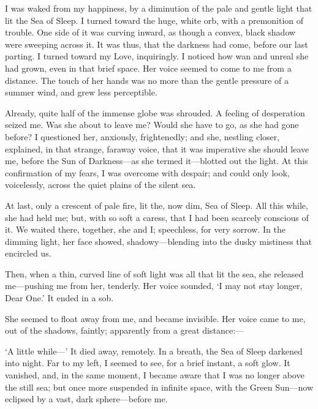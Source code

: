 
\clearpage
\label{ch:15}

\begin{ChapterStart}
\null\null
{}
\end{ChapterStart}

I was waked from my happiness, by a diminution of the pale and gentle light that lit the Sea of Sleep. I turned toward the huge, white orb, with a premonition of trouble. One side of it was curving inward, as though a convex, black shadow were sweeping across it. It was thus, that the darkness had come, before our last parting. I turned toward my Love, inquiringly. I noticed how wan and unreal she had grown, even in that brief space. Her voice seemed to come to me from a distance. The touch of her hands was no more than the gentle pressure of a summer wind, and grew less perceptible.

Already, quite half of the immense globe was shrouded. A feeling of desperation seized me. Was she about to leave me? Would she have to go, as she had gone before? I questioned her, anxiously, frightenedly; and she, nestling closer, explained, in that strange, faraway voice, that it was imperative she should leave me, before the Sun of Darkness---as she termed it---blotted out the light. At this confirmation of my fears, I was overcome with despair; and could only look, voicelessly, across the quiet plains of the silent sea.

At last, only a crescent of pale fire, lit the, now dim, Sea of Sleep. All this while, she had held me; but, with so soft a caress, that I had been scarcely conscious of it. We waited there, together, she and I; speechless, for very sorrow. In the dimming light, her face showed, shadowy---blending into the dusky mistiness that encircled us.

Then, when a thin, curved line of soft light was all that lit the sea, she released me---pushing me from her, tenderly. Her voice sounded, ‘I may not stay longer, Dear One.’ It ended in a sob.

She seemed to float away from me, and became invisible. Her voice came to me, out of the shadows, faintly; apparently from a great distance:---

‘A little while---’ It died away, remotely. In a breath, the Sea of Sleep darkened into night. Far to my left, I seemed to see, for a brief instant, a soft glow. It vanished, and, in the same moment, I became aware that I was no longer above the still sea; but once more suspended in infinite space, with the Green Sun---now eclipsed by a vast, dark sphere---before me.

